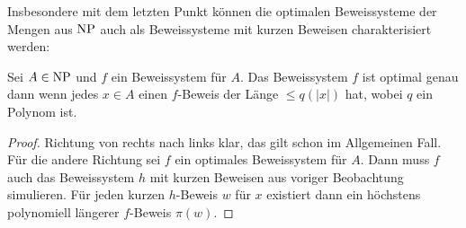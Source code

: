 Insbesondere mit dem letzten Punkt können die optimalen Beweissysteme der Mengen aus $\mathrm{NP}$ auch als Beweissysteme mit kurzen Beweisen charakterisiert werden:
\begin{observation}\label{obs:ps-for-np-optimal}
    Sei $A\in\mathrm{NP}$ und $f$ ein Beweissystem für $A$. Das Beweissystem $f$ ist optimal genau dann wenn jedes $x\in A$ einen $f$-Beweis der Länge $\leq q(|x|)$ hat, wobei $q$ ein Polynom ist.
\end{observation}
\begin{proof}
    Richtung von rechts nach links klar, das gilt schon im Allgemeinen Fall. Für die andere Richtung sei $f$ ein optimales Beweissystem für $A$. Dann muss $f$ auch das Beweissystem $h$ mit kurzen Beweisen aus voriger Beobachtung simulieren. Für jeden kurzen $h$-Beweis $w$ für $x$ existiert dann ein höchstens polynomiell längerer $f$-Beweis $\pi(w)$.
\end{proof}

